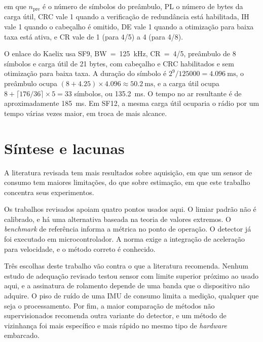 \noindent
em que $n_{\mathrm{pre}}$ é o número de símbolos do preâmbulo, PL o número de bytes da carga útil, CRC vale 1 quando a verificação de redundância está habilitada, IH vale 1 quando o cabeçalho é
omitido, DE vale 1 quando a otimização para baixa taxa está ativa, e CR vale de 1 (para 4/5) a 4 (para 4/8).

O enlace do Kaelix usa SF9, BW~=~\SI{125}{\kilo\hertz}, CR~=~4/5, preâmbulo de 8 símbolos e carga útil de \num{21} bytes, com cabeçalho e CRC habilitados e sem otimização para baixa taxa. A duração
do símbolo é $2^9/\num{125000} = \SI{4,096}{\milli\second}$, o preâmbulo ocupa $(8 + \num{4,25}) \times \num{4,096} \approx \SI{50,2}{\milli\second}$, e a carga útil ocupa
$8 + \lceil 176/36 \rceil \times 5 = 33$ símbolos, ou \SI{135,2}{\milli\second}. O tempo no ar resultante é de aproximadamente \SI{185}{\milli\second}. Em SF12, a mesma carga útil ocuparia o rádio
por um tempo várias vezes maior, em troca de mais alcance.

\section{Síntese e lacunas}
\label{sec:rev-lacunas}

A literatura revisada tem mais resultados sobre aquisição, em que um sensor de consumo tem maiores limitações, do que sobre estimação, em que este trabalho concentra seus experimentos.

Os trabalhos revisados apoiam quatro pontos usados aqui. O limiar padrão não é calibrado, e há uma alternativa baseada na teoria de valores extremos. O \emph{benchmark} de referência informa a métrica
no ponto de operação. O detector já foi executado em microcontrolador. A norma exige a integração de aceleração para velocidade, e o método correto é conhecido.

Três escolhas deste trabalho vão contra o que a literatura recomenda. Nenhum estudo de adequação revisado testou sensor com limite superior próximo ao usado aqui, e a assinatura de rolamento depende de
uma banda que o dispositivo não adquire. O piso de ruído de uma IMU de consumo limita a medição, qualquer que seja o processamento. Por fim, a maior comparação de métodos não supervisionados recomenda
outra variante do detector, e um método de vizinhança foi mais específico e mais rápido no mesmo tipo de \emph{hardware} embarcado. 

